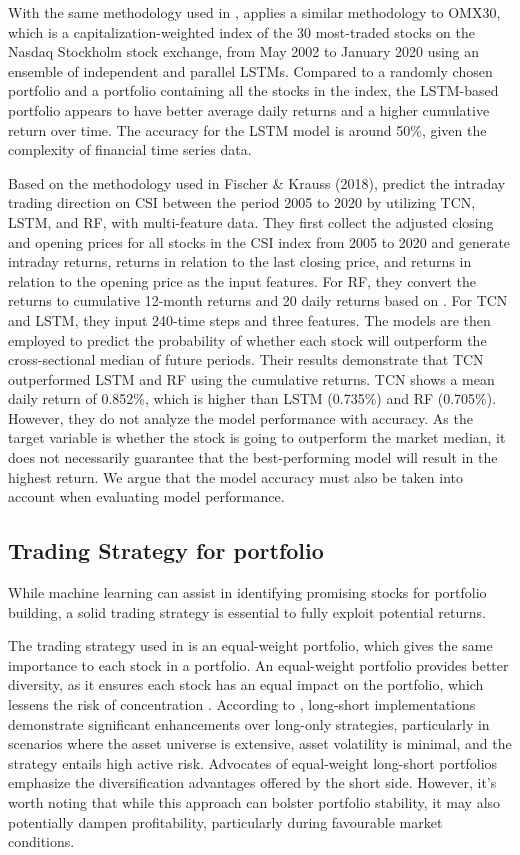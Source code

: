 \documentclass{article}
\begin{document}
With the same methodology used in \cite{fischer2018deep}, \cite{fjellstrom2022long} applies a similar methodology to OMX30, which is a capitalization-weighted index of the 30 most-traded stocks on the Nasdaq Stockholm stock exchange, from May 2002 to January 2020 using an ensemble of independent and parallel LSTMs. Compared to a randomly chosen portfolio and a portfolio containing all the stocks in the index, the LSTM-based portfolio appears to have better average daily returns and a higher cumulative return over time. The accuracy for the LSTM model is around 50\%, given the complexity of financial time series data.

Based on the methodology used in Fischer \& Krauss (2018), \cite{xiang2023predicting} predict the intraday trading direction on CSI between the period 2005 to 2020 by utilizing TCN, LSTM, and RF, with multi-feature data. They first collect the adjusted closing and opening prices for all stocks in the CSI index from 2005 to 2020 and generate intraday returns, returns in relation to the last closing price, and returns in relation to the opening price as the input features. For RF, they convert the returns to cumulative 12-month returns and 20 daily returns based on \cite{takeuchi2013applying}. For TCN and LSTM, they input 240-time steps and three features. The models are then employed to predict the probability of whether each stock will outperform the cross-sectional median of future periods. Their results demonstrate that TCN outperformed LSTM and RF using the cumulative returns. TCN shows a mean daily return of 0.852\%, which is higher than LSTM (0.735\%) and RF (0.705\%). However, they do not analyze the model performance with accuracy. As the target variable is whether the stock is going to outperform the market median, it does not necessarily guarantee that the best-performing model will result in the highest return. We argue that the model accuracy must also be taken into account when evaluating model performance.

\subsection{Trading Strategy for portfolio}
While machine learning can assist in identifying promising stocks for portfolio building, a solid trading strategy is essential to fully exploit potential returns.

The trading strategy used in \cite{fischer2018deep} is an equal-weight portfolio, which gives the same importance to each stock in a portfolio. An equal-weight portfolio provides better diversity, as it ensures each stock has an equal impact on the portfolio, which lessens the risk of concentration \citep{maillard2010properties}. According to \cite{grinold2000efficiency}, long-short implementations demonstrate significant enhancements over long-only strategies, particularly in scenarios where the asset universe is extensive, asset volatility is minimal, and the strategy entails high active risk. Advocates of equal-weight long-short portfolios emphasize the diversification advantages offered by the short side. However, it's worth noting that while this approach can bolster portfolio stability, it may also potentially dampen profitability, particularly during favourable market conditions. 
\end{document}
